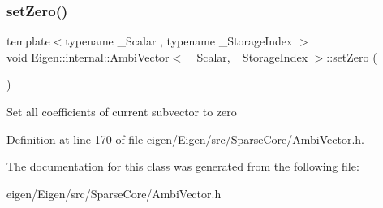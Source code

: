 \subsubsection{\texorpdfstring{set\+Zero()}{setZero()}}
{\footnotesize\ttfamily template$<$typename \+\_\+\+Scalar , typename \+\_\+\+Storage\+Index $>$ \\
void \hyperlink{class_eigen_1_1internal_1_1_ambi_vector}{Eigen\+::internal\+::\+Ambi\+Vector}$<$ \+\_\+\+Scalar, \+\_\+\+Storage\+Index $>$\+::set\+Zero (\begin{DoxyParamCaption}{ }\end{DoxyParamCaption})}

Set all coefficients of current subvector to zero 

Definition at line \hyperlink{eigen_2_eigen_2src_2_sparse_core_2_ambi_vector_8h_source_l00170}{170} of file \hyperlink{eigen_2_eigen_2src_2_sparse_core_2_ambi_vector_8h_source}{eigen/\+Eigen/src/\+Sparse\+Core/\+Ambi\+Vector.\+h}.



The documentation for this class was generated from the following file\+:\begin{DoxyCompactItemize}
\item 
eigen/\+Eigen/src/\+Sparse\+Core/\+Ambi\+Vector.\+h\end{DoxyCompactItemize}
